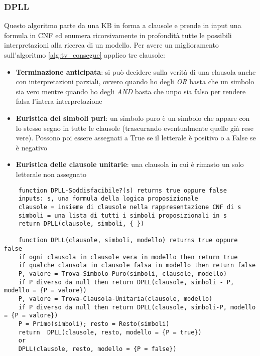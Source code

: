 \subsubsection{DPLL}
\label{alg:dpll}
Questo algoritmo parte da una KB in forma a clausole e prende in input una formula in CNF ed enumera ricorsivamente in profondità tutte le possibili interpretazioni alla ricerca di un modello. Per avere un miglioramento sull'algoritmo \ref{alg:tv_consegue} applico tre clausole:
\begin{itemize}
	\item \textbf{Terminazione anticipata}: si può decidere sulla verità di una clausola anche con interpretazioni parziali, ovvero quando ho degli \textit{OR} basta che un simbolo sia vero mentre quando ho degli \textit{AND} basta che unpo sia falso per rendere falsa l'intera interpretazione
	\item \textbf{Euristica dei simboli puri}: un simbolo puro è un simbolo che appare con lo stesso segno in tutte le clausole (trascurando eventualmente quelle già rese vere). Possono poi essere assegnati a True se il letterale è positivo o a False se è negativo
	\item \textbf{Euristica delle clausole unitarie}: una clausola in cui è rimasto un solo letterale non assegnato
\end{itemize}

\begin{lstlisting}
	function DPLL-Soddisfacibile?(s) returns true oppure false
	inputs: s, una formula della logica proposizionale
	clausole = insieme di clausole nella rappresentazione CNF di s
	simboli = una lista di tutti i simboli proposizionali in s
	return DPLL(clausole, simboli, { })
	
	function DPLL(clausole, simboli, modello) returns true oppure false
	if ogni clausola in clausole vera in modello then return true
	if qualche clausola in clausole falsa in modello then return false
	P, valore = Trova-Simbolo-Puro(simboli, clausole, modello)
	if P diverso da null then return DPLL(clausole, simboli - P, modello = {P = valore})
	P, valore = Trova-Clausola-Unitaria(clausole, modello)
	if P diverso da null then return DPLL(clausole, simboli-P, modello = {P = valore})
	P = Primo(simboli); resto = Resto(simboli)
	return	DPLL(clausole, resto, modello = {P = true})
	or
	DPLL(clausole, resto, modello = {P = false})
\end{lstlisting}


